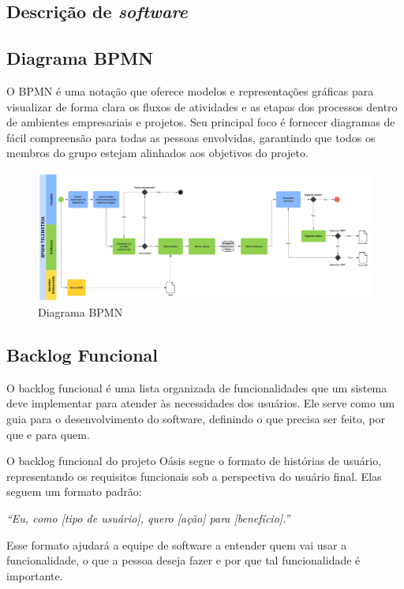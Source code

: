  \begin{landscape}
\section{Descrição de \textit{software}}
\subsection{Diagrama BPMN}

O BPMN é uma notação que oferece modelos e representações gráficas para visualizar de forma clara os fluxos de atividades e as etapas dos processos dentro de ambientes empresariais e projetos. Seu principal foco é fornecer diagramas de fácil compreensão para todas as pessoas envolvidas, garantindo que todos os membros do grupo estejam alinhados aos objetivos do projeto.

\begin{figure}[H]
    \centering
    \includegraphics[width=1\linewidth]{editaveis/figuras/bpmn.jpg}
    \caption{Diagrama BPMN}
    \label{fig:enter-label}
\end{figure}
\end{landscape}

\subsection{Backlog Funcional}
O backlog funcional é uma lista organizada de funcionalidades que um sistema deve implementar para atender às necessidades dos usuários. Ele serve como um guia para o desenvolvimento do software, definindo o que precisa ser feito, por que e para quem.

O backlog funcional do projeto Oásis segue o formato de histórias de usuário, representando os requisitos funcionais sob a perspectiva do usuário final. Elas seguem um formato padrão:

\textit{“Eu, como [tipo de usuário], quero [ação] para [benefício].”}

Esse formato ajudará a equipe de software a entender quem vai usar a funcionalidade, o que a pessoa deseja fazer e por que tal funcionalidade é importante.

